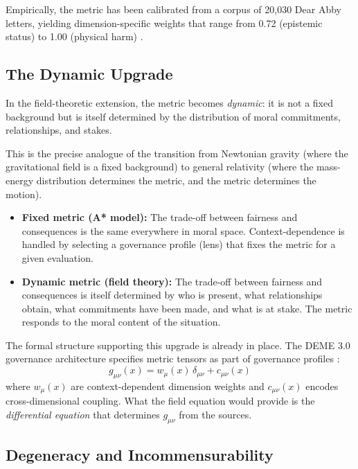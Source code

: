 \documentclass[12pt,letterpaper]{article}
\theoremstyle{definition}
\begin{document}
Empirically, the metric has been calibrated from a corpus of 20,030 Dear Abby letters, yielding dimension-specific weights that range from 0.72 (epistemic status) to 1.00 (physical harm) \cite{bond2026ge}.

\subsection{The Dynamic Upgrade}

In the field-theoretic extension, the metric becomes \emph{dynamic}: it is not a fixed background but is itself determined by the distribution of moral commitments, relationships, and stakes.

This is the precise analogue of the transition from Newtonian gravity (where the gravitational field is a fixed background) to general relativity (where the mass-energy distribution determines the metric, and the metric determines the motion).

\begin{itemize}
    \item \textbf{Fixed metric (A* model):} The trade-off between fairness and consequences is the same everywhere in moral space. Context-dependence is handled by selecting a governance profile (lens) that fixes the metric for a given evaluation.
    \item \textbf{Dynamic metric (field theory):} The trade-off between fairness and consequences is itself determined by who is present, what relationships obtain, what commitments have been made, and what is at stake. The metric responds to the moral content of the situation.
\end{itemize}

The formal structure supporting this upgrade is already in place. The DEME 3.0 governance architecture specifies metric tensors as part of governance profiles \cite[Ch.~18]{bond2026ge}:
\begin{equation}
g_{\mu\nu}(x) = w_\mu(x)\, \delta_{\mu\nu} + c_{\mu\nu}(x)
\end{equation}
where $w_\mu(x)$ are context-dependent dimension weights and $c_{\mu\nu}(x)$ encodes cross-dimensional coupling. What the field equation would provide is the \emph{differential equation} that determines $g_{\mu\nu}$ from the sources.

\subsection{Degeneracy and Incommensurability}
\end{document}
